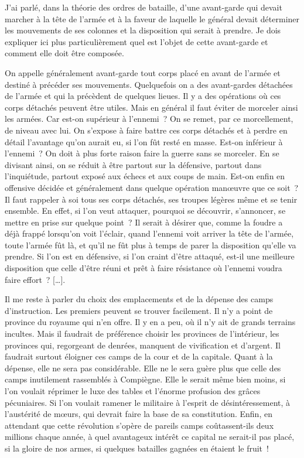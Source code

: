 \documentclass[french,twoside]{book} %
\begin{document}
J’ai parlé, dans la théorie des ordres de bataille, d’une avant-garde qui devait marcher à la tête de l’armée et à la faveur de laquelle le général devait déterminer les mouvements de ses colonnes et la disposition qui serait à prendre. Je dois expliquer ici plus particulièrement quel est l’objet de cette avant-garde et comment elle doit être composée.\par
On appelle généralement avant-garde tout corps placé en avant de l’armée et destiné à précéder ses mouvements. Quelquefois on a des avant-gardes détachées de l’armée et qui la précèdent de quelques lieues. Il y a des opérations où ces corps détachés peuvent être utiles. Mais en général il faut éviter de morceler ainsi les armées. Car est-on supérieur à l’ennemi ? On se remet, par ce morcellement, de niveau avec lui. On s’expose à faire battre ces corps détachés et à perdre en détail l’avantage qu’on aurait eu, si l’on fût resté en masse. Est-on inférieur à l’ennemi ? On doit à plus forte raison faire la guerre sans se morceler. En se divisant ainsi, on se réduit à être partout sur la défensive, partout dans l’inquiétude, partout exposé aux échecs et aux coups de main. Est-on enfin en offensive décidée et généralement dans quelque opération manœuvre que ce soit ? Il faut rappeler à soi tous ses corps détachés, ses troupes légères même et se tenir ensemble. En effet, si l’on veut attaquer, pourquoi se découvrir, s’annoncer, se mettre en prise sur quelque point ? Il serait à désirer que, comme la foudre a déjà frappé lorsqu’on voit l’éclair, quand l’ennemi voit arriver la tête de l’armée, toute l’armée fût là, et qu’il ne fût plus à temps de parer la disposition qu’elle va prendre. Si l’on est en défensive, si l’on craint d’être attaqué, est-il une meilleure disposition que celle d’être réuni et prêt à faire résistance où l’ennemi voudra faire effort ? […].\par
Il me reste à parler du choix des emplacements et de la dépense des camps d’instruction. Les premiers peuvent se trouver facilement. Il n’y a point de province du royaume qui n’en offre. Il y en a peu, où il n’y ait de grands terrains incultes. Mais il faudrait de préférence choisir les provinces de l’intérieur, les provinces qui, regorgeant de denrées, manquent de vivification et d’argent. Il faudrait surtout éloigner ces camps de la cour et de la capitale. Quant à la dépense, elle ne sera pas considérable. Elle ne le sera guère plus que celle des camps inutilement rassemblés à Compiègne. Elle le serait même bien moins, si l’on voulait réprimer le luxe des tables et l’énorme profusion des grâces pécuniaires. Si l’on voulait ramener le militaire à l’esprit de désintéressement, à l’austérité de mœurs, qui devrait faire la base de sa constitution. Enfin, en attendant que cette révolution s’opère de pareils camps coûtassent-ils deux millions chaque année, à quel avantageux intérêt ce capital ne serait-il pas placé, si la gloire de nos armes, si quelques batailles gagnées en étaient le fruit !
\end{document}

